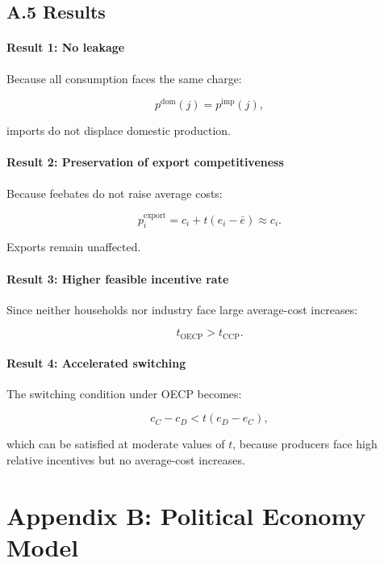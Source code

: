 \documentclass[12pt]{article}
\begin{document}
\subsection{A.5 Results}

\paragraph{Result 1: No leakage}

Because all consumption faces the same charge:

\[
p^{\text{dom}}(j) = p^{\text{imp}}(j),
\]

imports do not displace domestic production.

\paragraph{Result 2: Preservation of export competitiveness}

Because feebates do not raise average costs:

\[
p^{\text{export}}_i = c_i + t (e_i - \bar e) \approx c_i.
\]

Exports remain unaffected.

\paragraph{Result 3: Higher feasible incentive rate}

Since neither households nor industry face large average-cost increases:

\[
t_{\text{OECP}} > t_{\text{CCP}}.
\]

\paragraph{Result 4: Accelerated switching}

The switching condition under OECP becomes:

\[
c_C - c_D < t (e_D - e_C),
\]

which can be satisfied at moderate values of $t$, because producers face 
high relative incentives but no average-cost increases.

\section{Appendix B: Political Economy Model}
\end{document}
